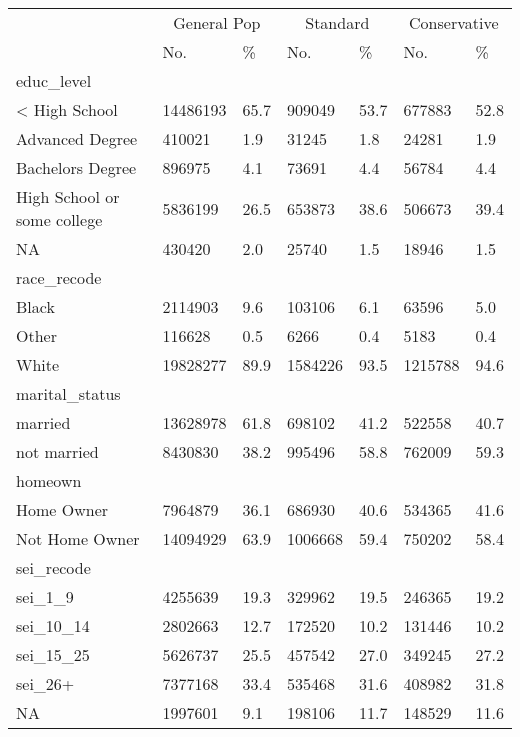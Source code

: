 \captionsetup[table]{labelformat=empty,skip=1pt}
\begin{longtable}{lllllll}
\toprule
& \multicolumn{2}{c}{General Pop} & \multicolumn{2}{c}{Standard} & \multicolumn{2}{c}{Conservative} \\ 
 \cmidrule(lr){2-3}\cmidrule(lr){4-5}\cmidrule(lr){6-7}
 & No. & \% & No. & \% & No. & \% \\ 
\midrule
\multicolumn{1}{l}{educ\_level} \\ 
\midrule
< High School & 14486193 & 65.7 & 909049 & 53.7 & 677883 & 52.8 \\ 
Advanced Degree & 410021 & 1.9 & 31245 & 1.8 & 24281 & 1.9 \\ 
Bachelors Degree & 896975 & 4.1 & 73691 & 4.4 & 56784 & 4.4 \\ 
High School or some college & 5836199 & 26.5 & 653873 & 38.6 & 506673 & 39.4 \\ 
NA & 430420 & 2.0 & 25740 & 1.5 & 18946 & 1.5 \\ 
\midrule
\multicolumn{1}{l}{race\_recode} \\ 
\midrule
Black & 2114903 & 9.6 & 103106 & 6.1 & 63596 & 5.0 \\ 
Other & 116628 & 0.5 & 6266 & 0.4 & 5183 & 0.4 \\ 
White & 19828277 & 89.9 & 1584226 & 93.5 & 1215788 & 94.6 \\ 
\midrule
\multicolumn{1}{l}{marital\_status} \\ 
\midrule
married & 13628978 & 61.8 & 698102 & 41.2 & 522558 & 40.7 \\ 
not married & 8430830 & 38.2 & 995496 & 58.8 & 762009 & 59.3 \\ 
\midrule
\multicolumn{1}{l}{homeown} \\ 
\midrule
Home Owner & 7964879 & 36.1 & 686930 & 40.6 & 534365 & 41.6 \\ 
Not Home Owner & 14094929 & 63.9 & 1006668 & 59.4 & 750202 & 58.4 \\ 
\midrule
\multicolumn{1}{l}{sei\_recode} \\ 
\midrule
sei\_1\_9 & 4255639 & 19.3 & 329962 & 19.5 & 246365 & 19.2 \\ 
sei\_10\_14 & 2802663 & 12.7 & 172520 & 10.2 & 131446 & 10.2 \\ 
sei\_15\_25 & 5626737 & 25.5 & 457542 & 27.0 & 349245 & 27.2 \\ 
sei\_26+ & 7377168 & 33.4 & 535468 & 31.6 & 408982 & 31.8 \\ 
NA & 1997601 & 9.1 & 198106 & 11.7 & 148529 & 11.6 \\ 

\end{longtable}
